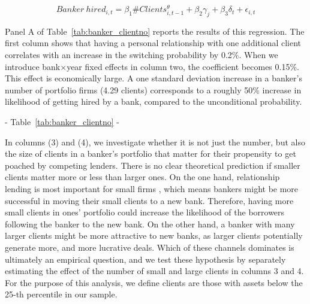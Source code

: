 \begin{equation}
Banker~hired_{i,t} = \beta_1 \#Clients^{\theta}_{i,t-1} + \beta_2 \gamma_{j} +\beta_3 \delta_t + \epsilon_{i,t} \label{eq:switch}
\end{equation}

Panel A of Table~\ref{tab:banker_clientno} reports the results of this regression. The first column shows that having a personal relationship with one additional client correlates with an increase in the switching probability by 0.2\%. %
When we introduce bank$\times$year fixed effects in column two, the coefficient becomes 0.15\%. This effect is economically large. A one standard deviation increase in a banker's number of portfolio firms (4.29 clients)  corresponds to a roughly 50\% increase in likelihood of getting hired by a bank, compared to the unconditional probability. 

\begin{center} - Table~\ref{tab:banker_clientno} - \end{center}

In columns (3) and (4), we investigate whether it is not just the number, but also the size of clients in a banker's portfolio that matter for their propensity to get poached by competing lenders. There is no clear theoretical prediction if smaller clients matter more or less than larger ones. On the one hand, relationship lending is most important for small firms \citep{Petersen.1994c}, which means bankers might be more successful in moving their small clients to a new bank. 
Therefore, having more small clients in ones' portfolio could increase the likelihood of the borrowers following the banker to the new bank. %
On the other hand, a banker with many larger clients might be more attractive to new banks, as larger clients potentially generate more, and more lucrative deals. Which of these channels dominates is ultimately an empirical question, and we test these hypothesis by separately estimating the effect of the number of small and large clients in columns 3 and 4. For the purpose of this analysis, we define clients are those with assets below the 25-th percentile in our sample. 

